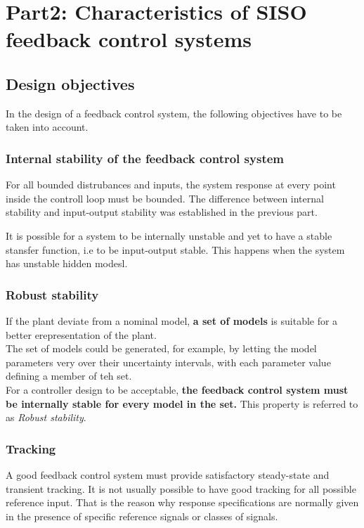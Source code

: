 \chapter{Part2: Characteristics of SISO feedback control systems}

\section{Design objectives}
In the design of a feedback control system, the following objectives have to be taken into account.
\subsection{Internal stability of the feedback control system}
For all bounded distrubances and inputs, the system response at every point inside the controll loop must be bounded. The difference between internal stability and input-output stability was established in the previous part. \\
\begin{factbox}
It is possible for a system to be internally unstable and yet to have a stable stansfer function, i.e to be input-output stable. This happens when the system has unstable hidden modesl.
\end{factbox}

\subsection{Robust stability}
If the plant deviate from a nominal model, \textbf{a set of models} is suitable for a better erepresentation of the plant.\\
The set of models could be generated, for example, by letting the model parameters very over their uncertainty intervals, with each parameter value defining a member of teh set.\\
For a controller design to be acceptable, \textbf{the feedback control system must be internally stable for every model in the set.} This property is referred to as \textit{Robust stability}.
\subsection{Tracking}
A good feedback control system must provide satisfactory steady-state and transient tracking. It is not usually possible to have good tracking for all possible reference input. That is the reason why response specifications are normally given in the presence of specific reference signals or classes of signals.

